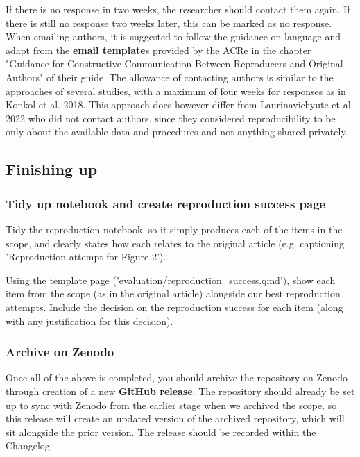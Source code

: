 If there is no response in two weeks, the researcher should contact them again. If there is still no response two weeks later, this can be marked as no response. When emailing authors, it is suggested to follow the guidance on language and adapt from the \textbf{email template}s provided by the ACRe in the chapter "Guidance for Constructive Communication Between Reproducers and Original Authors" of their guide.\autocite{berkeley_initiative_for_transparency_in_the_social_sciences_guide_2022} The allowance of contacting authors is similar to the approaches of several studies,\autocite{krafczyk_learning_2021,wood_push_2018,berkeley_initiative_for_transparency_in_the_social_sciences_guide_2022,hardwicke_analytic_2021,konkol_computational_2019} with a maximum of four weeks for responses as in Konkol et al. 2018\autocite{konkol_computational_2019}. This approach does however differ from Laurinavichyute et al. 2022\autocite{laurinavichyute_share_2022} who did not contact authors, since they considered reproducibility to be only about the available data and procedures and not anything shared privately.\autocite{laurinavichyute_share_2022}

\vspace{0.5cm}
\subsection{Finishing up}

\subsubsection{Tidy up notebook and create reproduction success page}

Tidy the reproduction notebook, so it simply produces each of the items in the scope, and clearly states how each relates to the original article (e.g. captioning 'Reproduction attempt for Figure 2').

Using the template page ('evaluation/reproduction\_success.qmd'), show each item from the scope (as in the original article) alongside our best reproduction attempts. Include the decision on the reproduction success for each item (along with any justification for this decision).

\vspace{0.5cm}
\subsubsection{Archive on Zenodo}

Once all of the above is completed, you should archive the repository on Zenodo through creation of a new \textbf{GitHub release}. The repository should already be set up to sync with Zenodo from the earlier stage when we archived the scope, so this release will create an updated version of the archived repository, which will sit alongside the prior version. The release should be recorded within the Changelog.